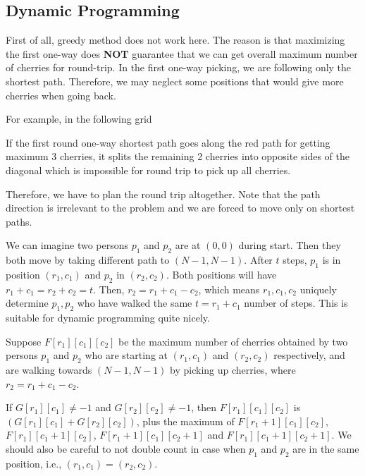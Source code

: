 \documentclass[a4paper,12pt]{article}
\begin{document}
\subsection{Dynamic Programming}
First of all, greedy method does not work here. The reason is that maximizing the first one-way does \textbf{NOT} guarantee that we can get overall maximum number of cherries for round-trip. In the first one-way picking, we are following only the shortest path. Therefore, we may neglect some positions that would give more cherries when going back.
\par
For example, in the following grid
\begin{figure}[H]
\centering
{}
\end{figure}
If the first round one-way shortest path goes along the red path for getting maximum 3 cherries, it splits the remaining 2 cherries into opposite sides of the diagonal which is impossible for round trip to pick up all cherries. 
\par
Therefore, we have to plan the round trip altogether. Note that the path direction is irrelevant to the problem and we are forced to move only on shortest paths.
\par
We can imagine two persons $p_1$ and $p_2$ are at $(0,0)$ during start. Then they both move by taking different path to $(N-1, N-1)$. After $t$ steps, $p_1$ is in position $(r_1,c_1)$ and $p_2$ in $(r_2, c_2)$. Both positions will have $r_1+c_1=r_2+c_2=t$. Then, $r_2 = r_1 + c_1 - c_2$, which means $r_1,c_1,c_2$ uniquely determine $p_1, p_2$ who have walked the same $t = r_1+c_1$ number of steps. This is suitable for dynamic programming quite nicely.
\par
Suppose $F[r_1][c_1][c_2]$ be the maximum number of cherries obtained by two persons $p_1$ and $p_2$ who are starting at $(r_1, c_1)$ and $(r_2, c_2)$ respectively, and are walking towards $(N-1, N-1)$ by picking up cherries, where $r_2 = r_1+c_1-c_2$.
\par
If $G[r_1][c_1] \neq -1$ and $G[r_2][c_2] \neq -1$, then $F[r_1][c_1][c_2]$ is $(G[r_1][c_1] + G[r_2][c_2])$, plus the maximum of $F[r_1+1][c_1][c_2]$, $F[r_1][c_1+1][c_2]$, $F[r_1+1][c_1][c_2+1]$ and $F[r_1][c_1+1][c_2+1]$. We should also be careful to not double count in case when $p_1$ and $p_2$ are in the same position, i.e., $(r_1, c_1) = (r_2, c_2)$.
\end{document}
